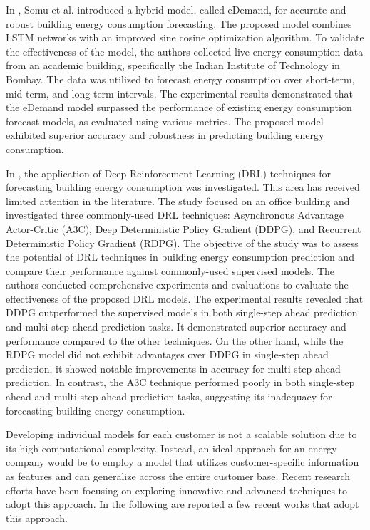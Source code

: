 In \cite{SOMU2020114131}, Somu et al. introduced a hybrid model, called eDemand, for accurate and robust building energy consumption forecasting.
The proposed model combines LSTM networks with an improved sine cosine optimization algorithm.
To validate the effectiveness of the model, the authors collected live energy consumption data from an academic building, specifically the Indian Institute of Technology in Bombay.
The data was utilized to forecast energy consumption over short-term, mid-term, and long-term intervals.
The experimental results demonstrated that the eDemand model surpassed the performance of existing energy consumption forecast models, as evaluated using various metrics.
The proposed model exhibited superior accuracy and robustness in predicting building energy consumption.

In \cite{LIU2020109675}, the application of Deep Reinforcement Learning (DRL) techniques for forecasting building energy consumption was investigated.
This area has received limited attention in the literature.
The study focused on an office building and investigated three commonly-used DRL techniques: Asynchronous Advantage Actor-Critic (A3C), Deep Deterministic Policy Gradient (DDPG), and Recurrent Deterministic Policy Gradient (RDPG).
The objective of the study was to assess the potential of DRL techniques in building energy consumption prediction and compare their performance against commonly-used supervised models.
The authors conducted comprehensive experiments and evaluations to evaluate the effectiveness of the proposed DRL models.
The experimental results revealed that DDPG outperformed the supervised models in both single-step ahead prediction and multi-step ahead prediction tasks.
It demonstrated superior accuracy and performance compared to the other techniques.
On the other hand, while the RDPG model did not exhibit advantages over DDPG in single-step ahead prediction, it showed notable improvements in accuracy for multi-step ahead prediction.
In contrast, the A3C technique performed poorly in both single-step ahead and multi-step ahead prediction tasks, suggesting its inadequacy for forecasting building energy consumption.

Developing individual models for each customer is not a scalable solution due to its high computational complexity.
Instead, an ideal approach for an energy company would be to employ a model that utilizes customer-specific information as features and can generalize across the entire customer base.
Recent research efforts have been focusing on exploring innovative and advanced techniques to adopt this approach.
In the following are reported a few recent works that adopt this approach.

